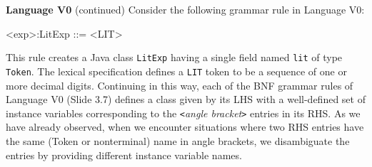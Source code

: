 \begin{minipage}[t]{\sw}
\slidenumber
\LARGE
{\bf Language V0} (continued)\exx
Consider the following grammar rule in Language V0:
\begin{qv}
<exp>:LitExp ::= <LIT>
\end{qv}
This rule creates a Java class \verb'LitExp'
having a single field named \verb'lit' of type \verb'Token'.
The lexical specification defines a \verb'LIT' token
to be a sequence of one or more decimal digits.\exx
Continuing in this way,
each of the BNF grammar rules of Language V0 (Slide 3.7)
defines a class given by its LHS
with a well-defined set of instance variables corresponding
to the \verb'<'{\em angle bracket}\verb'>' entries in its RHS.\exx
As we have already observed,
when we encounter situations where two RHS entries
have the same (Token or nonterminal) name in angle brackets,
we disambiguate the entries
by providing different instance variable names.
\end{minipage}
\clearpage
